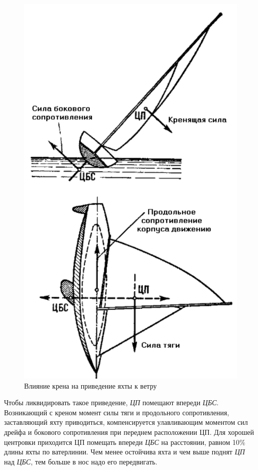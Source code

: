 \documentclass[a4paper, 12pt, twoside, final]{scrbook}
\begin{document}
\begin{figure}[htbp]
   \centering
   \includegraphics{pics/100_Vlijanie_krena} %
   \caption{Влияние крена на приведение яхты к ветру}
   \label{fig:100}
\end{figure}

Чтобы ликвидировать такое приведение, \textit{ЦП} помещают впереди \textit{ЦБС}. Возникающий с креном момент силы тяги и продольного сопротивления, заставляющий яхту приводиться, компенсируется улавливающим моментом сил дрейфа и бокового сопротивления при переднем расположении ЦП. Для хорошей центровки приходится ЦП помещать впереди \textit{ЦБС} на расстоянии, равном 10\% длины яхты по ватерлинии. Чем менее остойчива яхта и чем выше поднят \textit{ЦП} над \textit{ЦБС}, тем больше в нос надо его передвигать.
\end{document}
